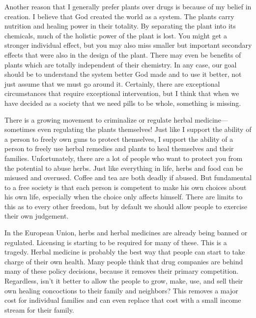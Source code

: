 \begin{infonote}
Another reason that I generally prefer plants over drugs is because of
my belief in creation. I believe that God created the world as a
system. The plants carry nutrition and healing power in their totality.
By separating the plant into its chemicals, much of the holistic power
of the plant is lost. You might get a stronger individual effect, but
you may also miss smaller but important secondary effects that were
also in the design of the plant. There may even be benefits of plants
which are totally independent of their chemistry.  In any case, our
goal should be to understand the system better God made and to use it
better, not just assume that we must go around it. Certainly, there are
exceptional circumstances that require exceptional intervention, but I
think that when we have decided as a society that we need pills to be
whole, something is missing.
\end{infonote}

\begin{policynote}
There is a growing movement to criminalize or regulate herbal
medicine—sometimes even regulating the plants themselves!  Just like I
support the ability of a person to freely own guns to protect
themselves, I support the ability of a person to freely use herbal
remedies and plants to heal themselves and their families.
Unfortunately, there are a lot of people who want to
{\textquotedbl}protect{\textquotedbl} you from the potential to abuse
herbs. Just like everything in life, herbs and food can be misused and
overused. Coffee and tea are both deadly if abused. But fundamental to
a free society is that each person is competent to make
his own choices about
his own life,
especially when the choice only affects himself.  There are limits to
this as to every other freedom, but by default we should allow people
to exercise their own judgement.

In the European Union, herbs and herbal medicines are already being
banned or regulated. Licensing is starting to be required for many of
these. This is a tragedy. Herbal medicine is probably the best way that
people can start to take charge of their own health. Many people think
that drug companies are behind many of these policy decisions, because
it removes their primary competition.
Regardless,
isn’t it better to
allow the people to
grow, make, use, and sell their own healing concoctions to their family
and neighbors?  This removes a major cost
for individual
families and can even replace
that
cost with a small
income stream for their family.
\end{policynote}

